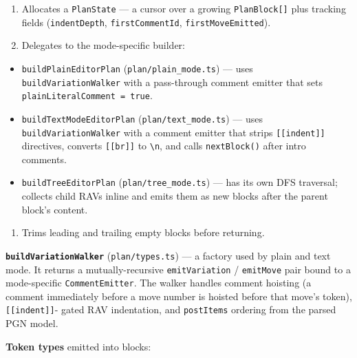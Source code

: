 \documentclass[]{article}
\providecommand{\tightlist}{%
  \setlength{\itemsep}{0pt}\setlength{\parskip}{0pt}}
\begin{document}
\begin{enumerate}
\def\labelenumi{\arabic{enumi}.}
\tightlist
\item
  Allocates a \texttt{PlanState} --- a cursor over a growing
  \texttt{PlanBlock{[}{]}} plus tracking fields (\texttt{indentDepth},
  \texttt{firstCommentId}, \texttt{firstMoveEmitted}).
\item
  Delegates to the mode-specific builder:
\end{enumerate}

\begin{itemize}
\tightlist
\item
  \texttt{buildPlainEditorPlan} (\texttt{plan/plain\_mode.ts}) --- uses
  \texttt{buildVariationWalker} with a pass-through comment emitter that
  sets \texttt{plainLiteralComment\ =\ true}.
\item
  \texttt{buildTextModeEditorPlan} (\texttt{plan/text\_mode.ts}) ---
  uses \texttt{buildVariationWalker} with a comment emitter that strips
  \texttt{{[}{[}indent{]}{]}} directives, converts
  \texttt{{[}{[}br{]}{]}} to \texttt{\textbackslash{}n}, and calls
  \texttt{nextBlock()} after intro comments.
\item
  \texttt{buildTreeEditorPlan} (\texttt{plan/tree\_mode.ts}) --- has its
  own DFS traversal; collects child RAVs inline and emits them as new
  blocks after the parent block's content.
\end{itemize}

\begin{enumerate}
\def\labelenumi{\arabic{enumi}.}
\setcounter{enumi}{2}
\tightlist
\item
  Trims leading and trailing empty blocks before returning.
\end{enumerate}

\textbf{\texttt{buildVariationWalker}} (\texttt{plan/types.ts}) --- a
factory used by plain and text mode. It returns a mutually-recursive
\texttt{emitVariation} / \texttt{emitMove} pair bound to a mode-specific
\texttt{CommentEmitter}. The walker handles comment hoisting (a comment
immediately before a move number is hoisted before that move's token),
\texttt{{[}{[}indent{]}{]}}- gated RAV indentation, and
\texttt{postItems} ordering from the parsed PGN model.

\textbf{Token types} emitted into blocks:
\end{document}
